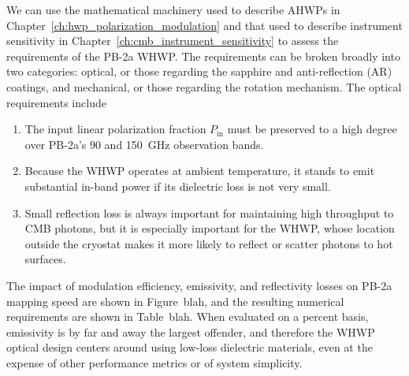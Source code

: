 We can use the mathematical machinery used to describe AHWPs in Chapter~\ref{ch:hwp_polarization_modulation} and that used to describe instrument sensitivity in Chapter~\ref{ch:cmb_instrument_sensitivity} to assess the requirements of the PB-2a WHWP. The requirements can be broken broadly into two categories: optical, or those regarding the sapphire and anti-reflection (AR) coatings, and mechanical, or those regarding the rotation mechanism. The optical requirements include
\begin{enumerate}
    \item {} The input linear polarization fraction $P_{\mathrm{in}}$ must be preserved to a high degree over PB-2a's 90 and 150~GHz observation bands.
    \item {} Because the WHWP operates at ambient temperature, it stands to emit substantial in-band power if its dielectric loss is not very small.
    \item {} Small reflection loss is always important for maintaining high throughput to CMB photons, but it is especially important for the WHWP, whose location outside the cryostat makes it more likely to reflect or scatter photons to hot surfaces.
\end{enumerate}
The impact of modulation efficiency, emissivity, and reflectivity losses on PB-2a mapping speed are shown in Figure~blah, and the resulting numerical requirements are shown in Table~blah. When evaluated on a percent basis, emissivity is by far and away the largest offender, and therefore the WHWP optical design centers around using low-loss dielectric materials, even at the expense of other performance metrics or of system simplicity. 

